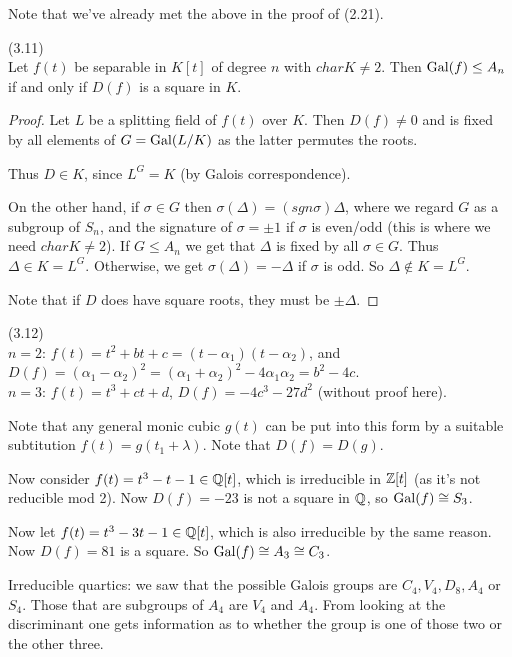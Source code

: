\documentclass[a4paper]{article}
\begin{document}
Note that we've already met the above in the proof of (2.21).

\begin{lemma} (3.11)\\
Let $f(t)$ be separable in $K[t]$ of degree $n$ with $char K \neq 2$. Then $\operatorname{Gal}(f) \leq A_n$ if and only if $D(f)$ is a square in $K$.
\begin{proof}
Let $L$ be a splitting field of $f(t)$ over $K$. Then $D(f) \neq 0$ and is fixed by all elements of $G =\operatorname{Gal}(L/K)$ as the latter permutes the roots.

Thus $D \in K$, since $L^G = K$ (by Galois correspondence).

On the other hand, if $\sigma \in G$ then $\sigma(\Delta) = (sgn \sigma) \Delta$, where we regard $G$ as a subgroup of $S_n$, and the signature of $\sigma = \pm 1$ if $\sigma$ is even/odd (this is where we need $char K \neq 2$). If $G \leq A_n$ we get that $\Delta$ is fixed by all $\sigma \in G$. Thus $\Delta \in K = L^G$. Otherwise, we get $\sigma(\Delta) = -\Delta$ if $\sigma$ is odd. So $\Delta \not \in K = L^G$.

Note that if $D$ does have square roots, they must be $\pm \Delta$.
\end{proof}
\end{lemma}

\begin{eg} (3.12)\\
$n=2$: $f(t) = t^2 + bt + c = (t-\alpha_1)(t-\alpha_2)$, and $D(f) = (\alpha_1-\alpha_2)^2 = (\alpha_1+\alpha_2)^2-4\alpha_1\alpha_2 = b^2-4c$.\\
$n=3$: $f(t) = t^3 + ct +d$, $D(f) = -4c^3-27d^2$ (without proof here).

Note that any general monic cubic $g(t)$ can be put into this form by a suitable subtitution $f(t) = g(t_1+\lambda)$. Note that $D(f) = D(g)$.

Now consider $f(t) = t^3 - t - 1 \in \mathbb{Q}[t]$, which is irreducible in $\mathbb{Z}[t]$ (as it's not reducible mod 2). Now $D(f) = -23$ is not a square in $\mathbb{Q}$, so $\operatorname{Gal}(f) \cong S_3$.

Now let $f(t) = t^3 - 3t - 1 \in \mathbb{Q}[t]$, which is also irreducible by the same reason. Now $D(f) = 81$ is a square. So $\operatorname{Gal}(f) \cong A_3 \cong C_3$.
\end{eg}

Irreducible quartics: we saw that the possible Galois groups are $C_4,V_4,D_8,A_4$ or $S_4$. Those that are subgroups of $A_4$ are $V_4$ and $A_4$. From looking at the discriminant one gets information as to whether the group is one of  those two or the other three.
\end{document}
